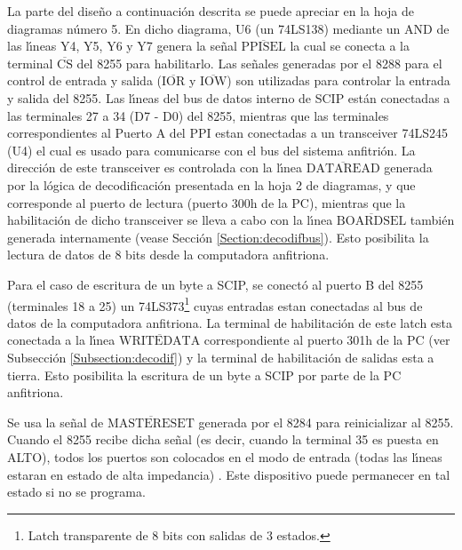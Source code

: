 La parte del dise\~no a continuaci\'on descrita se puede apreciar en la hoja de diagramas %
n\'umero 5. En dicho diagrama, U6 (un 74LS138) mediante un AND de las l\'{\i}neas Y4, Y5, Y6 y %
Y7 genera la se\~nal $\overline{\mbox{PPISEL}}$  la cual se conecta a la terminal %
$\overline{\mbox{CS}}$ del 8255 para habilitarlo. Las se\~nales generadas por el 8288 para %
el control de entrada y salida ($\overline{\mbox{IOR}}$ y $\overline{\mbox{IOW}}$) son %
utilizadas para controlar la entrada y salida del 8255. Las l\'{\i}neas del bus  de datos %
interno de SCIP est\'an conectadas a las terminales 27 a 34 (D7 - D0) del 8255, mientras que las %
terminales correspondientes al Puerto A del PPI estan conectadas a un transceiver 74LS245 (U4) %
el cual es usado para comunicarse con el bus del sistema anfitri\'on. La direcci\'on de este %
transceiver es controlada con la l\'{\i}nea $\overline{\mbox{DATAREAD}}$ generada por la %
l\'ogica de decodificaci\'on presentada en la hoja 2 de diagramas, y que corresponde al puerto %
de lectura (puerto 300h de la PC), mientras que la habilitaci\'on de dicho transceiver se lleva %
a cabo con la l\'{\i}nea $\overline{\mbox{BOARDSEL}}$ tambi\'en generada internamente %
(vease Secci\'on \ref{Section:decodifbus}). Esto posibilita la lectura de datos de 8 bits %
desde la computadora anfitriona.

Para el caso de escritura de un byte a SCIP, se conect\'o al puerto B del 8255 (terminales 18 a %
25) un 74LS373\footnote{Latch transparente de 8 bits con salidas de 3 estados.} cuyas entradas %
estan conectadas al bus de datos de la computadora anfitriona. La terminal de habilitaci\'on de %
este latch esta conectada a la l\'{\i}nea $\overline{\mbox{WRITEDATA}}$ correspondiente al %
puerto 301h de la PC (ver Subsecci\'on \ref{Subsection:decodif}) y la terminal de %
habilitaci\'on de salidas esta a tierra. Esto posibilita la escritura de un byte a SCIP por %
parte de la PC anfitriona.

Se usa la se\~nal de $\overline{\mbox{MASTERESET}}$ generada por el 8284 para reinicializar %
al 8255.  Cuando el 8255 recibe dicha se\~nal (es decir, cuando la terminal 35 es puesta en %
ALTO), todos los puertos son colocados en el modo de entrada (todas las l\'{\i}neas estaran en %
estado de alta impedancia) \cite{Intel:Perif}. Este dispositivo puede permanecer en tal estado %
si no se programa.

